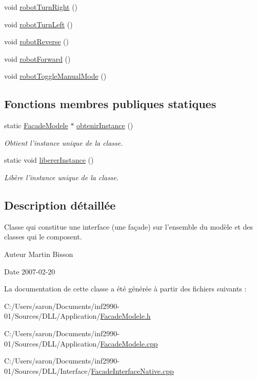 \begin{DoxyCompactItemize}
\item 
void \hyperlink{group__inf2990_gad7ed7270a0485181ddcce168ef035db9}{robot\-Turn\-Right} ()
\item 
void \hyperlink{group__inf2990_ga315a7219bfaadcf4b5667aa26e715a59}{robot\-Turn\-Left} ()
\item 
void \hyperlink{group__inf2990_ga0337e81d62cf2a38aace4b6bc0a9056a}{robot\-Reverse} ()
\item 
void \hyperlink{group__inf2990_ga7d7a91c04dd796ce9db41286868b092c}{robot\-Forward} ()
\item 
void \hyperlink{group__inf2990_ga3e853c603a2393bbaf048b225eb47483}{robot\-Toggle\-Manual\-Mode} ()
\end{DoxyCompactItemize}
\subsection*{Fonctions membres publiques statiques}
\begin{DoxyCompactItemize}
\item 
static \hyperlink{class_facade_modele}{Facade\-Modele} $\ast$ \hyperlink{group__inf2990_ga63593b81c6f3cc2251e2b61d9e8fc670}{obtenir\-Instance} ()
\begin{DoxyCompactList}\small\item\em Obtient l'instance unique de la classe. \end{DoxyCompactList}\item 
static void \hyperlink{group__inf2990_gacbf0495fda26f5be37089470dc5f4372}{liberer\-Instance} ()
\begin{DoxyCompactList}\small\item\em Libère l'instance unique de la classe. \end{DoxyCompactList}\end{DoxyCompactItemize}


\subsection{Description détaillée}
Classe qui constitue une interface (une façade) sur l'ensemble du modèle et des classes qui le composent. 

\begin{DoxyAuthor}{Auteur}
Martin Bisson 
\end{DoxyAuthor}
\begin{DoxyDate}{Date}
2007-\/02-\/20 
\end{DoxyDate}


La documentation de cette classe a été générée à partir des fichiers suivants \-:\begin{DoxyCompactItemize}
\item 
C\-:/\-Users/saron/\-Documents/inf2990-\/01/\-Sources/\-D\-L\-L/\-Application/\hyperlink{_facade_modele_8h}{Facade\-Modele.\-h}\item 
C\-:/\-Users/saron/\-Documents/inf2990-\/01/\-Sources/\-D\-L\-L/\-Application/\hyperlink{_facade_modele_8cpp}{Facade\-Modele.\-cpp}\item 
C\-:/\-Users/saron/\-Documents/inf2990-\/01/\-Sources/\-D\-L\-L/\-Interface/\hyperlink{_facade_interface_native_8cpp}{Facade\-Interface\-Native.\-cpp}\end{DoxyCompactItemize}
